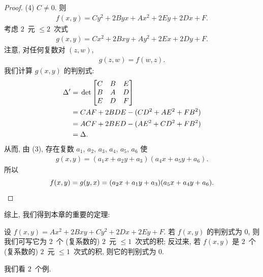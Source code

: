 \documentclass[../libro.tex]{subfiles}
\begin{document}
\begin{proof}
    (4)
    \(C \neq 0\).
    则
    \begin{align*}
        f(x, y) = Cy^2 + 2Byx + Ax^2 + 2Ey + 2Dx + F.
    \end{align*}
    考虑 \(2\)~元 \({\leq} 2\)~次式
    \begin{align*}
        g(x, y) = Cx^2 + 2Bxy + Ay^2 + 2Ex + 2Dy + F.
    \end{align*}
    注意, 对任何复数对 \((z, w)\),
    \begin{align*}
        g(z, w) = f(w, z).
    \end{align*}
    我们计算 \(g(x, y)\) 的判别式:
    \begin{align*}
        \Delta'
        = {} &
         \det
        \begin{bmatrix}
            C & B & E \\
            B & A & D \\
            E & D & F \\
        \end{bmatrix}                     \\
        = {} & CAF + 2BDE - (CD^2 + AE^2 + FB^2) \\
        = {} & ACF + 2BED - (AE^2 + CD^2 + FB^2) \\
        = {} & \Delta.
    \end{align*}
    从而, 由 (3),
    存在复数
    \(a_1\), \(a_2\), \(a_3\), \(a_4\), \(a_5\), \(a_6\)
    使
    \begin{align*}
        g(x, y) = (a_1 x + a_2 y + a_3) (a_4 x + a_5 y + a_6).
    \end{align*}
    所以
    \begin{equation*}
        f(x, y) = g(y, x) = (a_2 x + a_1 y + a_3) (a_5 x + a_4 y + a_6).
        \qedhere
    \end{equation*}
\end{proof}

综上, 我们得到本章的重要的定理:

\begin{theorem}
    设 \(f(x, y) = Ax^2 + 2Bxy + Cy^2 + 2Dx + 2Ey + F\).
    若 \(f(x, y)\) 的判别式为 \(0\),
    则我们可写它为 \(2\)~个 (复系数的)
    \(2\)~元 \({\leq} 1\)~次式的积;
    反过来,
    若 \(f(x, y)\) 是 \(2\)~个 (复系数的)
    \(2\)~元 \({\leq} 1\)~次式的积,
    则它的判别式为 \(0\).
\end{theorem}

我们看 \(2\)~个例.
\end{document}
